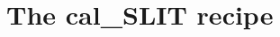 \clearpage
\newpage
\section{The cal\_SLIT recipe}
\label{ch:the_recipes:cal_SLIT_spirou}












